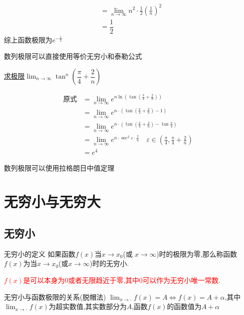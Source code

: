 \documentclass[8pt a4paper, oneside, UTF8]{ctexbook}
\begin{document}
\begin{sloppypar}
\begin{solution}
\begin{align*}
          & = \lim_{n\to\infty}n^2\cdot\frac12\left(\frac1n\right)^2 \\
          &= \dfrac{1}{2}
        \end{align*}
        综上函数极限为$e^{-\frac{1}{2}}$
    \end{solution}
    \begin{note}
        数列极限可以直接使用等价无穷小和泰勒公式
    \end{note}
    \begin{problem}
        \uline{求极限}$\lim_{n\to\infty}\tan^n\left(\dfrac\pi4+\dfrac2n\right)$
    \end{problem}
    \begin{solution}
        \begin{align*}
            \text{原式} & = \lim_{n\to\infty} e^{n \ln(\tan(\frac{\pi}{4}+\frac{2}{n}))}\\
            & =  \lim_{n\to\infty}e^{n\cdot (\tan(\frac{\pi}{4}+\frac{2}{n}) -1)}\\
            & = \lim_{n\to\infty}e^{n\cdot (\tan(\frac{\pi}{4}+\frac{2}{n}) -\tan \frac{\pi}{4})} \\
            & = \lim_{n\to\infty}e^{n \cdot \sec^2 \varepsilon \cdot \frac{2}{n}} \quad \varepsilon \in(\frac{\pi}{4},\frac{\pi}{4}+\frac{2}{n})\\
            &=e^4
        \end{align*}
    \end{solution}
    \begin{note}
        数列极限可以使用拉格朗日中值定理
    \end{note}
    \section{无穷小与无穷大}
    \subsection{无穷小}
    \begin{defn}{无穷小的定义}{}
        如果函数$f(x)$当$x\to x_0$(或 $x\to\infty$)时的极限为零,那么称函数$f(x)$为当$x\to x_0$(或$x\to\infty$)时的无穷小.
    \end{defn}
    \textcolor{red}{$f(x)$是可以本身为$0$或者无限趋近于零,其中$0$可以作为无穷小唯一常数}.
    \begin{criterion}{无穷小与函数极限的关系(脱帽法)}{}
        $\lim_{x\to\cdot}f(x)=A\Leftrightarrow f(x)=A+\alpha$,其中$\lim_{x\to\cdot}f(x)$为超实数值,其实数部分为$A$,函数$f(x)$的函数值为$A+\alpha$\label{wqx1}
    \end{criterion}

\end{sloppypar}
\end{document}
